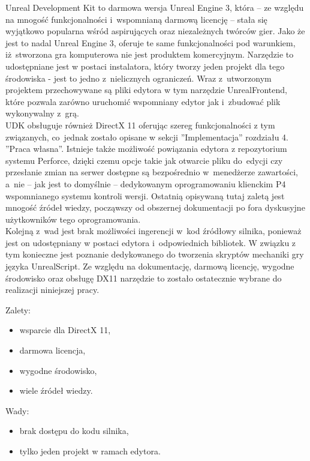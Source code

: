 Unreal Development Kit to darmowa wersja Unreal Engine 3, która -- ze względu na mnogość funkcjonalności i~wspomnianą darmową licencję -- stała się wyjątkowo popularna wśród aspirujących oraz niezależnych twórców gier. Jako że jest to nadal Unreal Engine 3, oferuje te same funkcjonalności pod warunkiem, iż~stworzona gra komputerowa nie jest produktem komercyjnym. Narzędzie to udostępniane jest w postaci instalatora, który tworzy jeden projekt dla tego środowiska - jest to jedno z~nielicznych ograniczeń. Wraz z~utworzonym projektem przechowywane są pliki edytora w tym narzędzie UnrealFrontend, które pozwala zarówno uruchomić wspomniany edytor jak i~zbudować plik wykonywalny z~grą.\\
UDK obsługuje również DirectX 11 oferując szereg funkcjonalności z tym związanych, co~jednak zostało opisane w sekcji ''Implementacja'' rozdziału 4. ''Praca własna''. Istnieje także możliwość powiązania edytora z repozytorium systemu Perforce, dzięki czemu opcje takie jak otwarcie pliku do~edycji czy przesłanie zmian na serwer dostępne są bezpośrednio w~menedżerze zawartości, a~nie -- jak jest to domyślnie -- dedykowanym oprogramowaniu klienckim P4 wspomnianego systemu kontroli wersji. Ostatnią opisywaną tutaj zaletą jest mnogość źródeł wiedzy, począwszy od obszernej dokumentacji po fora dyskusyjne użytkowników tego oprogramowania.\\
Kolejną z~wad jest brak możliwości ingerencji w~kod źródłowy silnika, ponieważ jest on udostępniany w postaci edytora i~odpowiednich bibliotek. W związku z tym konieczne jest poznanie dedykowanego do tworzenia skryptów mechaniki gry języka UnrealScript.
Ze względu na dokumentację, darmową licencję, wygodne środowisko oraz obsługę DX11 narzędzie to zostało ostatecznie wybrane do realizacji niniejszej pracy.\\

{\raggedright Zalety:
\begin{itemize}
\item wsparcie dla DirectX 11,
\item darmowa licencja,
\item wygodne środowisko,
\item wiele źródeł wiedzy.
\end{itemize}

Wady:
\begin{itemize}
\item brak dostępu do kodu silnika,
\item tylko jeden projekt w ramach edytora.
\end{itemize}
}

